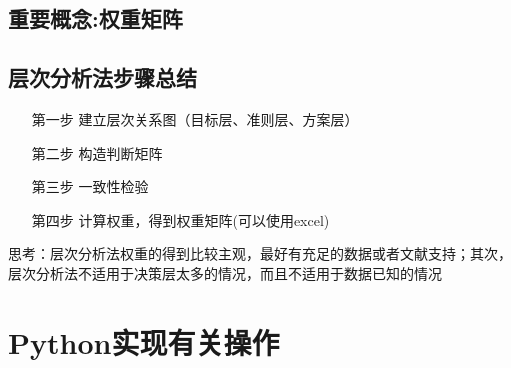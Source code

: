 \documentclass[UTF8]{ctexart}
\begin{document}
\subsection{\textbf{重要概念:权重矩阵}}

\subsection{\textbf{层次分析法步骤总结}}

\begin{enumerate}
\item [第一步] 建立层次关系图（目标层、准则层、方案层）
\item [第二步] 构造判断矩阵
\item [第三步] 一致性检验
\item [第四步] 计算权重，得到权重矩阵(可以使用excel)
\end{enumerate}

思考：层次分析法权重的得到比较主观，最好有充足的数据或者文献支持；其次，层次分析法不适用于决策层太多的情况，而且不适用于数据已知的情况


\section{Python实现有关操作}
\end{document}
